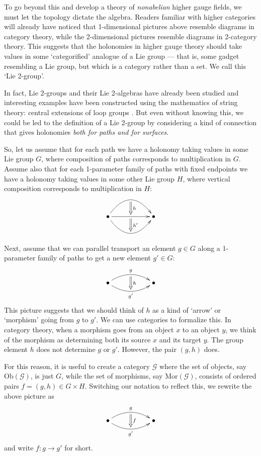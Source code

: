 \documentclass{article}
\newcommand{\maps}{\colon}
\newcommand{\Ob}{\mathrm{Ob}}
\newcommand{\Mor}{\mathrm{Mor}}
\def\twogroup {\mathcal{G}}
\begin{document}
To go beyond this and develop a theory of \emph{nonabelian} higher gauge 
fields, we must let the topology dictate the algebra.  Readers familiar
with higher categories will already have noticed that 1-dimensional 
pictures above resemble diagrams in category theory, while the
2-dimensional pictures resemble diagrams in 2-category theory.  This 
suggests that the holonomies in higher gauge 
theory should take values in some `categorified' analogue of
a Lie group --- that is, some gadget resembling a Lie group, but 
which is a category rather than a set.  We call this `Lie 2-group'.   

In fact, Lie 2-groups and their Lie 2-algebras have already been studied 
\cite{BaezLauda:2003,BaezCrans:2003} and interesting examples have been 
constructed using the mathematics of string theory: central extensions 
of loop groups \cite{BCSS}.  
But even without knowing this, we could be led to the definition of a 
Lie 2-group by considering a kind of connection that gives holonomies 
\emph{both for paths and for surfaces}.

So, let us assume that for each path we have a holonomy taking values 
in some Lie group $G$, where composition of paths corresponds to 
multiplication in $G$.  Assume also that for each 1-parameter family of 
paths with fixed endpoints we have a holonomy taking values in some other
Lie group $H$, where vertical composition corresponds to multiplication in
$H$:
\[
\xymatrix{
   \bullet \ar@/^2pc/[rr]_{}="0"
           \ar[rr]_{}="1"
           \ar@{=>}"0";"1"^{h}
           \ar@/_2pc/[rr]_{}="2"
           \ar@{=>}"1";"2"^{h'}
&& \bullet
}
\]

Next, assume that we can parallel transport an element $g \in G$
along a 1-parameter family of paths to get a new element $g' \in G$:
\[
\xymatrix{
   \bullet \ar@/^1pc/[rr]^{g}_{}="0"
           \ar@/_1pc/[rr]_{g'}_{}="1"
           \ar@{=>}"0";"1"^{h}
&& \bullet
}
\]
This picture suggests that we should think of $h$ as a kind of
`arrow' or `morphism' going from $g$ to $g'$.  We can use categories
to formalize this.  In category theory, when a morphism
goes from an object $x$ to an object $y$, we think of the morphism as
determining both its source $x$ and its target $y$.  The group
element $h$ does not determine $g$ or $g'$.  However, the pair $(g,h)$
does.  

For this reason, it is useful to create a category $\twogroup$ where the
set of objects, say $\Ob(\twogroup)$, is just $G$, while the set of
morphisms, say $\Mor(\twogroup)$, consists of ordered pairs $f = (g,h) 
\in G \times H$.  Switching our notation to reflect this, we rewrite the 
above picture as
\[
\xymatrix{
   \bullet \ar@/^1pc/[rr]^{g}_{}="0"
           \ar@/_1pc/[rr]_{g'}_{}="1"
           \ar@{=>}"0";"1"^{f}
&& \bullet
}
\]
and write $f \maps g \to g'$ for short.  
\end{document}
